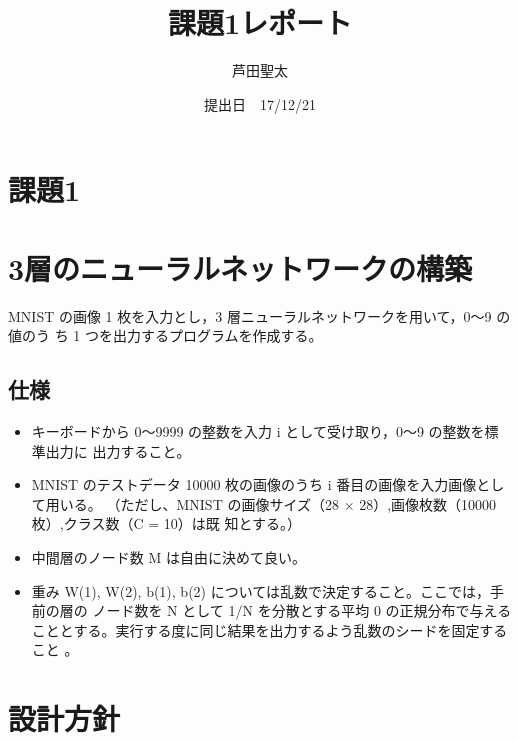 \documentclass{ujarticle}
\title {課題1レポート}
\author{芦田聖太}
\date{提出日　17/12/21}
\begin{document}
\begin{titlepage}
\maketitle
\thispagestyle{empty}
\end{titlepage}


\section*{課題1}
\section*{3層のニューラルネットワークの構築}
MNIST の画像 1 枚を入力とし，3 層ニューラルネットワークを用いて，0～9 の値のう
ち 1 つを出力するプログラムを作成する。

\subsection*{仕様}
\begin{itemize}
\item キーボードから 0～9999 の整数を入力 i として受け取り，0～9 の整数を標準出力に
出力すること。
\item MNIST のテストデータ 10000 枚の画像のうち i 番目の画像を入力画像として用いる。
（ただし、MNIST の画像サイズ（28 × 28）,画像枚数（10000 枚）,クラス数（C = 10）は既
知とする。）
\item 中間層のノード数 M は自由に決めて良い。
\item 重み W(1), W(2), b(1), b(2) については乱数で決定すること。ここでは，手前の層の
ノード数を N として 1/N を分散とする平均 0 の正規分布で与えることとする。実行する度に同じ結果を出力するよう乱数のシードを固定すること 。
\end{itemize}


\section*{設計方針}



\begin{lstlisting}[basicstyle=\ttfamily\footnotesize, frame=single]
\end{lstlisting}

\begin{lstlisting}[basicstyle=\ttfamily\footnotesize, frame=single]
\end{lstlisting}


\begin{center}
\end{center}
\end{document}
